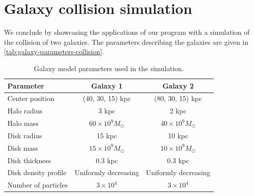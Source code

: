 \section{Galaxy collision simulation}
We conclude by showcasing the applications of our program with a simulation of the collision of two galaxies.
The parameters describing the galaxies are given in \autoref{tab:galaxy-parameters-collision}.
\begin{table}[htp]
    \centering
    \caption{Galaxy model parameters used in the simulation.}
    \label{tab:galaxy-parameters-collision}
    \begin{tabular}{lcc}
        \toprule
        \textbf{Parameter}   & \textbf{Galaxy 1}        & \textbf{Galaxy 2}        \\
        \midrule
        Center position      & (40, 30, 15) kpc         & (80, 30, 15) kpc         \\
        Halo radius          & 3 kpc                    & 2 kpc                    \\
        Halo mass            & $60 \times 10^9 M_\odot$ & $40 \times 10^9 M_\odot$ \\
        Disk radius          & 15 kpc                   & 10 kpc                   \\
        Disk mass            & $15 \times 10^9 M_\odot$ & $10 \times 10^9 M_\odot$ \\
        Disk thickness       & 0.3 kpc                  & 0.3 kpc                  \\
        Disk density profile & Uniformly decreasing     & Uniformly decreasing     \\
        Number of particles  & $3 \times 10^4$          & $3 \times 10^4$          \\
        \bottomrule
    \end{tabular}
\end{table}
